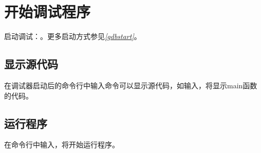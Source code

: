 \documentclass[a4paper,12pt,english]{sphinxmanual}
\begin{document}
\section{开始调试程序}
\label{\detokenize{debug/debug:id12}}
\sphinxAtStartPar
启动调试：。更多启动方式参见{\hyperref[\detokenize{debug/debug:gdbstart}]{\emph{{[}gdbstart{]}}}}。


\subsection{显示源代码}
\label{\detokenize{debug/debug:id13}}
\sphinxAtStartPar
在调试器启动后的命令行中输入命令可以显示源代码，如输入，将显示main函数的代码。


\subsection{运行程序}
\label{\detokenize{debug/debug:id14}}
\sphinxAtStartPar
在命令行中输入，将开始运行程序。
\end{document}
